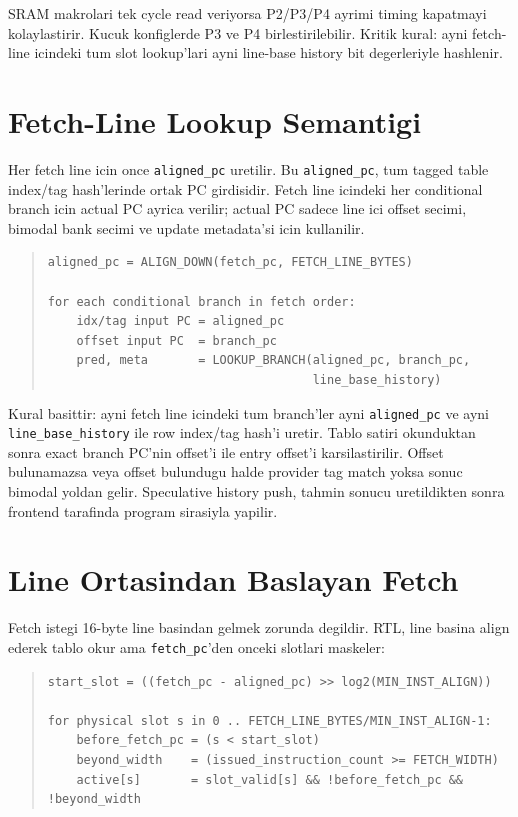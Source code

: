 \documentclass[11pt,a4paper]{article}
\newcommand{\code}[1]{\texttt{#1}}
\begin{document}
SRAM makrolari tek cycle read veriyorsa P2/P3/P4 ayrimi timing kapatmayi
kolaylastirir. Kucuk konfiglerde P3 ve P4 birlestirilebilir. Kritik kural:
ayni fetch-line icindeki tum slot lookup'lari ayni line-base history bit
degerleriyle hashlenir.

\section{Fetch-Line Lookup Semantigi}

Her fetch line icin once \code{aligned\_pc} uretilir. Bu \code{aligned\_pc},
tum tagged table index/tag hash'lerinde ortak PC girdisidir. Fetch line icindeki
her conditional branch icin actual PC ayrica verilir; actual PC sadece line ici
offset secimi, bimodal bank secimi ve update metadata'si icin kullanilir.

\begin{quote}
\footnotesize
\begin{verbatim}
aligned_pc = ALIGN_DOWN(fetch_pc, FETCH_LINE_BYTES)

for each conditional branch in fetch order:
    idx/tag input PC = aligned_pc
    offset input PC  = branch_pc
    pred, meta       = LOOKUP_BRANCH(aligned_pc, branch_pc,
                                     line_base_history)
\end{verbatim}
\end{quote}

Kural basittir: ayni fetch line icindeki tum branch'ler ayni
\code{aligned\_pc} ve ayni \code{line\_base\_history} ile row index/tag
hash'i uretir. Tablo satiri okunduktan sonra exact branch PC'nin offset'i ile
entry offset'i karsilastirilir. Offset bulunamazsa veya offset bulundugu halde
provider tag match yoksa sonuc bimodal yoldan gelir. Speculative history push,
tahmin sonucu uretildikten sonra frontend tarafinda program sirasiyla yapilir.

\section{Line Ortasindan Baslayan Fetch}

Fetch istegi 16-byte line basindan gelmek zorunda degildir. RTL, line basina
align ederek tablo okur ama \code{fetch\_pc}'den onceki slotlari maskeler:

\begin{quote}
\footnotesize
\begin{verbatim}
start_slot = ((fetch_pc - aligned_pc) >> log2(MIN_INST_ALIGN))

for physical slot s in 0 .. FETCH_LINE_BYTES/MIN_INST_ALIGN-1:
    before_fetch_pc = (s < start_slot)
    beyond_width    = (issued_instruction_count >= FETCH_WIDTH)
    active[s]       = slot_valid[s] && !before_fetch_pc && !beyond_width
\end{verbatim}
\end{quote}
\end{document}
